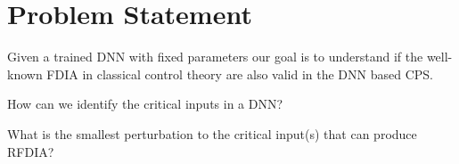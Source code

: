 \section{Problem Statement}

Given a trained DNN with fixed parameters our goal is to understand if the well-known \ac*{FDIA} in classical control theory are also valid in the DNN based CPS.
\begin{problem}
	How can we identify the critical inputs in a DNN?
\end{problem}

\begin{problem}
	What is the smallest perturbation to the critical input(s) that can produce \ac{RFDIA}?
\end{problem}




